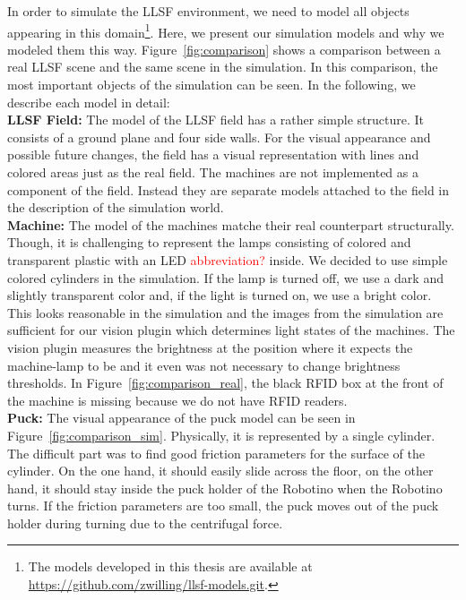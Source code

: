 In order to simulate the LLSF environment, we need to model all objects appearing in this domain\footnote{The models developed in this thesis are available at \url{https://github.com/zwilling/llsf-models.git}.}. Here, we present our simulation models and why we modeled them this way. Figure~\ref{fig:comparison} shows a comparison between a real LLSF scene and the same scene in the simulation. In this comparison, the most important objects of the simulation can be seen. In the following, we describe each model in detail:\\
\textbf{LLSF Field:} The model of the LLSF field has a rather simple structure. It consists of a ground plane and four side walls. For the visual appearance and possible future changes, the field has a visual representation with lines and colored areas just as the real field. The machines are not implemented as a component of the field. Instead they are separate models attached to the field in the description of the simulation world.\\
\textbf{Machine:} The model of the machines matche their real counterpart structurally. Though, it is challenging to represent the lamps consisting of colored and transparent plastic with an LED \textcolor{red}{abbreviation?} inside. We decided to use simple colored cylinders in the simulation. If the lamp is turned off, we use a dark and slightly transparent color and, if the light is turned on, we use a bright color. This looks reasonable in the simulation and the images from the simulation are sufficient for our vision plugin which determines light states of the machines. The vision plugin measures the brightness at the position where it expects the machine-lamp to be and it even was not necessary to change brightness thresholds. In Figure~\ref{fig:comparison_real}, the black RFID box at the front of the machine is missing because we do not have RFID readers.\\
\textbf{Puck:} The visual appearance of the puck model can be seen in Figure~\ref{fig:comparison_sim}. Physically, it is represented by a single cylinder. The difficult part was to find good friction parameters for the surface of the cylinder. On the one hand, it should easily slide across the floor, on the other hand, it should stay inside the puck holder of the Robotino when the Robotino turns. If the friction parameters are too small, the puck moves out of the puck holder during turning due to the centrifugal force.\\
